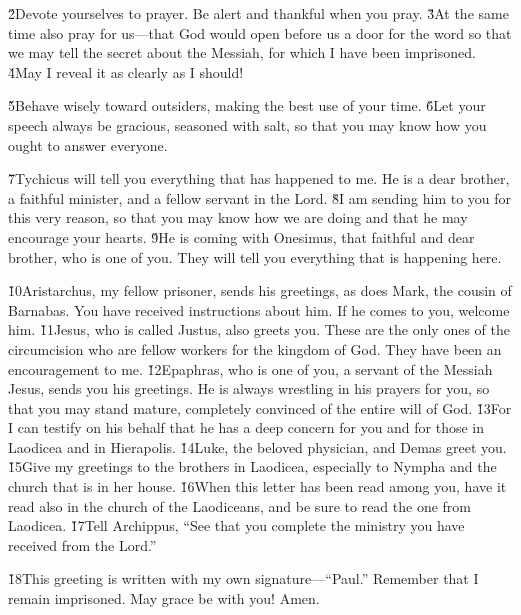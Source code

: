 \v{2}Devote yourselves to prayer. Be alert and thankful when you pray. \v{3}At the same time also pray for us---that God would open before us a door for the word so that we may tell the secret about the Messiah, for which I have been imprisoned. \v{4}May I reveal it as clearly as I should!

\v{5}Behave wisely toward outsiders, making the best use of your time. \v{6}Let your speech always be gracious, seasoned with salt, so that you may know how you ought to answer everyone.

\v{7}Tychicus will tell you everything that has happened to me. He is a dear brother, a faithful minister, and a fellow servant in the Lord. \v{8}I am sending him to you for this very reason, so that you may know how we are doing and that he may encourage your hearts. \v{9}He is coming with Onesimus, that faithful and dear brother, who is one of you. They will tell you everything that is happening here.

\v{10}Aristarchus, my fellow prisoner, sends his greetings, as does Mark, the cousin of Barnabas. You have received instructions about him. If he comes to you, welcome him. \v{11}Jesus, who is called Justus, also greets you. These are the only ones of the circumcision who are fellow workers for the kingdom of God. They have been an encouragement to me. \v{12}Epaphras, who is one of you, a servant of the Messiah Jesus, sends you his greetings. He is always wrestling in his prayers for you, so that you may stand mature, completely convinced of the entire will of God. \v{13}For I can testify on his behalf that he has a deep concern for you and for those in Laodicea and in Hierapolis. \v{14}Luke, the beloved physician, and Demas greet you. \v{15}Give my greetings to the brothers in Laodicea, especially to Nympha and the church that is in her house. \v{16}When this letter has been read among you, have it read also in the church of the Laodiceans, and be sure to read the one from Laodicea. \v{17}Tell Archippus, ``See that you complete the ministry you have received from the Lord.''

\v{18}This greeting is written with my own signature---``Paul.'' Remember that I remain imprisoned. May grace be with you! Amen.
